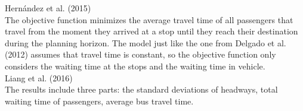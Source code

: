 \documentclass{article}
\begin{document}
\noindent Hernández et al. (2015)\\
The objective function minimizes the average travel time of all passengers that travel from the moment they arrived at a
stop until they reach their destination during the planning horizon. 
The model just like the one from Delgado et al. (2012) assumes that travel time is constant, 
so the objective function only considers the waiting time at the stops and the waiting time in vehicle.\\

\noindent Liang et al. (2016)\\
The results include three parts: the standard deviations of headways, total waiting time of passengers, average bus travel
time.\\
\end{document}
